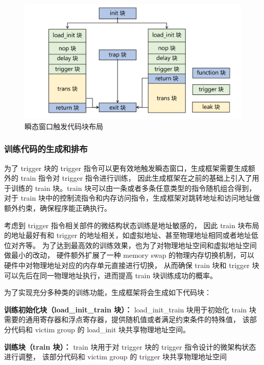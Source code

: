 \begin{figure}[!h]
    \centering
    \includegraphics[width=\linewidth]{figure/paper/arrange-stage1.png}
    \caption{瞬态窗口触发代码块布局}
    \label{paper:trigger-dist}
\end{figure}

\subsubsection{训练代码的生成和排布}

为了 trigger 块的 trigger 指令可以更有效地触发瞬态窗口，生成框架需要生成额外的 train 指令对 trigger 指令进行训练，
因此生成框架在之前的基础上引入了用于训练的 train 块。train 块可以由一条或者多条任意类型的指令随机组合得到，
对于 train 块中的控制流指令和内存访问指令，生成框架对跳转地址和访问地址做额外约束，确保程序能正确执行。

考虑到 trigger 指令相关部件的微结构状态训练是地址敏感的，
因此 train 块布局的地址最好有和 trigger 的地址相关，如虚拟地址、甚至物理地址相同或者地址低位对齐等。
为了达到最高效的训练效果，也为了对物理地址空间和虚拟地址空间做最小的改动，
硬件额外扩展了一种 memory swap 的物理内存切换机制，可以硬件中对物理地址对应的内存单元直接进行切换，
从而确保 train 块和 trigger 块可以先后在同一物理地址执行，进而提高 train 块训练成功的概率。

为了实现充分多种类的训练功能，生成框架将会生成如下代码块：\par

\textbf{训练初始化块（load\_init\_train 块）：}
load\_init\_train 块用于初始化 train 块需要的通用寄存器和浮点寄存器，提供随机值或者满足约束条件的特殊值，
该部分代码和 victim group 的 load\_init 块共享物理地址空间。\par

\textbf{训练块（train 块）：}
train 块用于对 trigger 块的 trigger 指令设计的微架构状态进行调整，
该部分代码和 victim group 的 trigger 块共享物理地址空间

